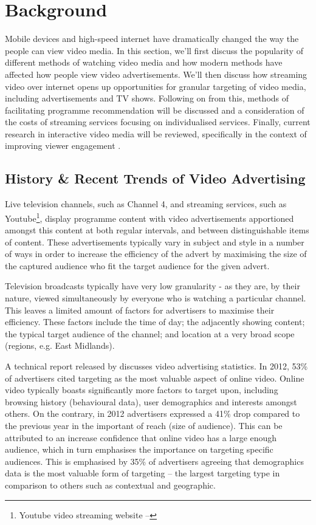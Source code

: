 \section{Background}

Mobile devices and high-speed internet have dramatically changed the way the people can view video media. In this section, we'll first discuss the popularity of different methods of watching video media and how modern methods have affected how people view video advertisements. We'll then discuss how streaming video over internet opens up opportunities for granular targeting of video media, including advertisements and TV shows. Following on from this, methods of facilitating programme recommendation will be discussed and a consideration of the costs of streaming services focusing on individualised services. Finally, current research in interactive video media will be reviewed, specifically in the context of improving viewer engagement \cite{what_is_engagement}.

\subsection{History \& Recent Trends of Video Advertising}

	Live television channels, such as Channel 4, and streaming services, such as Youtube\footnote{Youtube video streaming website -- }, display programme content with video advertisements apportioned amongst this content at both regular intervals, and between distinguishable items of content. These advertisements typically vary in subject and style in a number of ways in order to increase the efficiency of the advert by maximising the size of the captured audience who fit the target audience for the given advert.

	Television broadcasts typically have very low granularity - as they are, by their nature, viewed simultaneously by everyone who is watching a particular channel. This leaves a limited amount of factors for advertisers to maximise their efficiency. These factors include the time of day; the adjacently showing content; the typical target audience of the channel; and location at a very broad scope (regions, e.g. East Midlands).

	A technical report released by \citet{brightroll-report} discusses video advertising statistics. In 2012, 53\% of advertisers cited targeting as the most valuable aspect of online video. Online video typically boasts significantly more factors to target upon, including browsing history (behavioural data), user demographics and interests amongst others. On the contrary, in 2012 advertisers expressed a 41\% drop compared to the previous year in the important of reach (size of audience). This can be attributed to an increase confidence that online video has a large enough audience, which in turn emphasises the importance on targeting specific audiences. This is emphasised by 35\% of advertisers agreeing that demographics data is the most valuable form of targeting -- the largest targeting type in comparison to others such as contextual and geographic.

